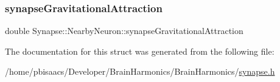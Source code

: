 \mbox{\label{structSynapse_1_1NearbyNeuron_ad81c00ed7d53310fa94f44e1e3fffc77}} 
\subsubsection{\texorpdfstring{synapse\+Gravitational\+Attraction}{synapseGravitationalAttraction}}
{\footnotesize\ttfamily double Synapse\+::\+Nearby\+Neuron\+::synapse\+Gravitational\+Attraction}



The documentation for this struct was generated from the following file\+:\begin{DoxyCompactItemize}
\item 
/home/pbisaacs/\+Developer/\+Brain\+Harmonics/\+Brain\+Harmonics/\mbox{\hyperlink{synapse_8h}{synapse.\+h}}\end{DoxyCompactItemize}
